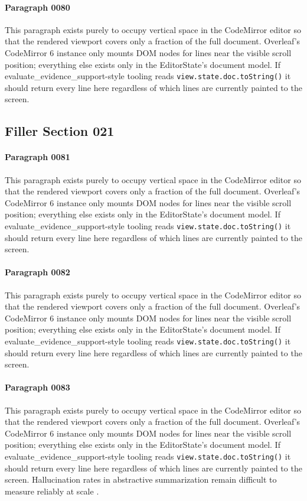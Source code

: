 \documentclass{article}
\begin{document}
\paragraph{Paragraph 0080}
This paragraph exists purely to occupy vertical space in the CodeMirror editor so that the rendered viewport covers only a fraction of the full document. Overleaf's CodeMirror 6 instance only mounts DOM nodes for lines near the visible scroll position; everything else exists only in the EditorState's document model. If evaluate\_evidence\_support-style tooling reads \texttt{view.state.doc.toString()} it should return every line here regardless of which lines are currently painted to the screen.

\subsection{Filler Section 021}
\paragraph{Paragraph 0081}
This paragraph exists purely to occupy vertical space in the CodeMirror editor so that the rendered viewport covers only a fraction of the full document. Overleaf's CodeMirror 6 instance only mounts DOM nodes for lines near the visible scroll position; everything else exists only in the EditorState's document model. If evaluate\_evidence\_support-style tooling reads \texttt{view.state.doc.toString()} it should return every line here regardless of which lines are currently painted to the screen.

\paragraph{Paragraph 0082}
This paragraph exists purely to occupy vertical space in the CodeMirror editor so that the rendered viewport covers only a fraction of the full document. Overleaf's CodeMirror 6 instance only mounts DOM nodes for lines near the visible scroll position; everything else exists only in the EditorState's document model. If evaluate\_evidence\_support-style tooling reads \texttt{view.state.doc.toString()} it should return every line here regardless of which lines are currently painted to the screen.

\paragraph{Paragraph 0083}
This paragraph exists purely to occupy vertical space in the CodeMirror editor so that the rendered viewport covers only a fraction of the full document. Overleaf's CodeMirror 6 instance only mounts DOM nodes for lines near the visible scroll position; everything else exists only in the EditorState's document model. If evaluate\_evidence\_support-style tooling reads \texttt{view.state.doc.toString()} it should return every line here regardless of which lines are currently painted to the screen. Hallucination rates in abstractive summarization remain difficult to measure reliably at scale \citep{park2022hallucination}.
\end{document}
